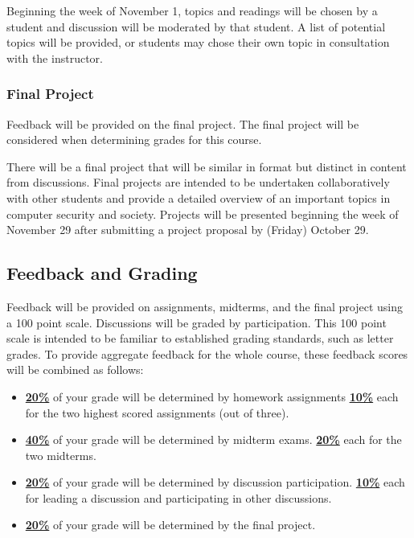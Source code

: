 \documentclass[11pt]{article}
\begin{document}
Beginning the week of November 1, topics and readings will be chosen by a student and discussion will be moderated by that student. A list of potential topics will be provided, or students may chose their own topic in consultation with the instructor.

\subsubsection*{Final Project}

Feedback will be provided on the final project. The final project will be considered when determining grades for this course.

There will be a final project that will be similar in format but distinct in content from
discussions. Final projects are intended to be undertaken collaboratively with other 
students and provide a detailed overview of an important topics in computer security and 
society. Projects will be presented beginning the week of November 29 after submitting a 
project proposal by (Friday) October 29.


\subsection*{Feedback and Grading}
Feedback will be provided on assignments, midterms, and the final project using a 100 point scale.
Discussions will be graded by participation.
This 100 point scale is intended to be familiar to established grading standards, such as letter grades. To provide aggregate feedback for the whole course, these feedback scores will be combined as follows:
\begin{itemize}
	\item \underline{\textbf{20\%}} of your grade will be determined by homework assignments
	\subitem \underline{\textbf{10\%}} each for the two highest scored assignments (out of three).
	\item \underline{\textbf{40\%}} of your grade will be determined by midterm exams.
	\subitem \underline{\textbf{20\%}} each for the two midterms.
	\item \underline{\textbf{20\%}} of your grade will be determined by discussion participation.
	\subitem \underline{\textbf{10\%}} each for leading a discussion and participating in other discussions.
	\item \underline{\textbf{20\%}} of your grade will be determined by the final project.
\end{itemize}
\end{document}
